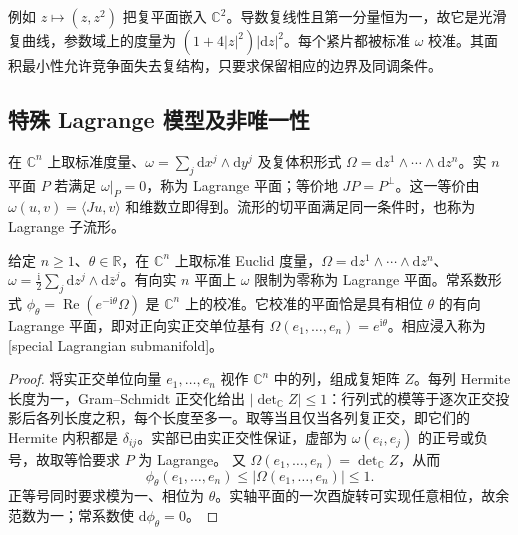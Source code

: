 例如 \(z\mapsto(z,z^2)\) 把复平面嵌入 \(\mathbb C^2\)。导数复线性且第一分量恒为一，故它是光滑复曲线，参数域上的度量为 \((1+4|z|^2)|\mathrm dz|^2\)。每个紧片都被标准 \(\omega\) 校准。其面积最小性允许竞争面失去复结构，只要求保留相应的边界及同调条件。

\subsection{特殊 Lagrange 模型及非唯一性}
\label{g3:subsec:1904:05}
在 \(\mathbb C^n\) 上取标准度量、\(\omega=\sum_j\mathrm dx^j\wedge\mathrm dy^j\) 及复体积形式
\(\Omega=\mathrm dz^1\wedge\cdots\wedge\mathrm dz^n\)。实 \(n\) 平面 \(P\) 若满足 \(\omega|_P=0\)，称为 Lagrange 平面；等价地 \(JP=P^\perp\)。这一等价由 \(\omega(u,v)=\langle Ju,v\rangle\) 和维数立即得到。流形的切平面满足同一条件时，也称为 Lagrange 子流形。

\begin{proposition}\label{g3:prop:special-lagrangian-calibration}
	给定 \(n\ge1\)、\(\theta\in\mathbb R\)，在 \(\mathbb C^n\) 上取标准 Euclid 度量，\(\Omega=\mathrm dz^1\wedge\cdots\wedge\mathrm dz^n\)、\(\omega=\tfrac{\mathrm i}2\sum_j\mathrm dz^j\wedge\mathrm d\bar z^j\)。有向实 \(n\) 平面上 \(\omega\) 限制为零称为 Lagrange 平面。常系数形式
	\(\phi_\theta=\operatorname{Re}(e^{-\mathrm i\theta}\Omega)\) 是 \(\mathbb C^n\) 上的校准。它校准的平面恰是具有相位 \(\theta\) 的有向 Lagrange 平面，即对正向实正交单位基有 \(\Omega(e_1,\ldots,e_n)=e^{\mathrm i\theta}\)。相应浸入称为[special Lagrangian submanifold]。
\end{proposition}
\begin{proof}
	将实正交单位向量 \(e_1,\ldots,e_n\) 视作 \(\mathbb C^n\) 中的列，组成复矩阵 \(Z\)。每列 Hermite 长度为一，Gram--Schmidt 正交化给出 \(|\det_{\mathbb C}Z|\le1\)：行列式的模等于逐次正交投影后各列长度之积，每个长度至多一。取等当且仅当各列复正交，即它们的 Hermite 内积都是 \(\delta_{ij}\)。实部已由实正交性保证，虚部为 \(\omega(e_i,e_j)\) 的正号或负号，故取等恰要求 \(P\) 为 Lagrange。
	又 \(\Omega(e_1,\ldots,e_n)=\det_{\mathbb C}Z\)，从而
	\[
		\phi_\theta(e_1,\ldots,e_n)
		\le |\Omega(e_1,\ldots,e_n)|\le1.
	\]
	正等号同时要求模为一、相位为 \(\theta\)。实轴平面的一次酉旋转可实现任意相位，故余范数为一；常系数使 \(\mathrm d\phi_\theta=0\)。
\end{proof}

